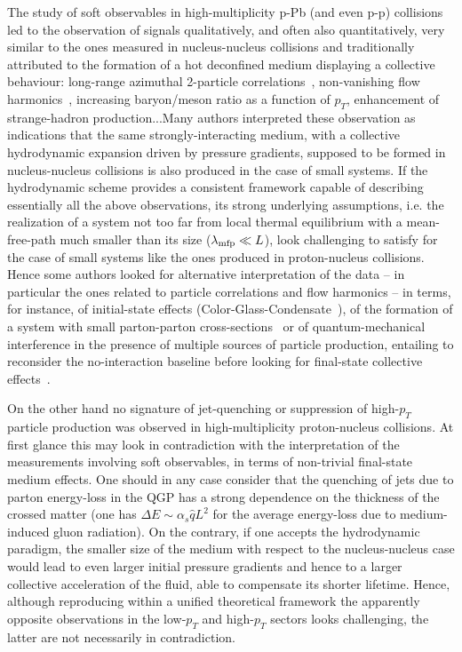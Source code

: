 The study of soft observables in high-multiplicity p-Pb (and even p-p) collisions led to the observation of signals qualitatively, and often also quantitatively, very similar to the ones measured in nucleus-nucleus collisions and traditionally attributed to the formation of a hot deconfined medium displaying a collective behaviour: long-range azimuthal 2-particle correlations~\cite{Khachatryan:2010gv,CMS:2012qk,Abelev:2012ola,Aad:2012gla}, non-vanishing flow harmonics~\cite{ABELEV:2013wsa,Khachatryan:2015waa}, increasing baryon/meson ratio as a function of $p_T$, enhancement of strange-hadron production...Many authors interpreted these observation as indications that the same strongly-interacting medium, with a collective hydrodynamic expansion driven by pressure gradients, supposed to be formed in nucleus-nucleus collisions is also produced in the case of small systems. If the hydrodynamic scheme provides a consistent framework capable of describing essentially all the above observations, its strong underlying assumptions, i.e. the realization of a system not too far from local thermal equilibrium with a mean-free-path much smaller than its size ($\lambda_{\rm mfp}\ll L$), look challenging to satisfy for the case of small systems like the ones produced in proton-nucleus collisions. Hence some authors looked for alternative interpretation of the data -- in particular the ones related to particle correlations and flow harmonics -- in terms, for instance, of initial-state effects (Color-Glass-Condensate~\cite{Dusling:2013qoz}), of the formation of a system with small parton-parton cross-sections~\cite{Bzdak:2014dia} or of quantum-mechanical interference in the presence of multiple sources of particle production, entailing to reconsider the no-interaction baseline before looking for final-state collective effects~\cite{Blok:2017pui}.

On the other hand no signature of jet-quenching or suppression of high-$p_T$ particle production was observed in high-multiplicity proton-nucleus collisions. At first glance this may look in contradiction with the interpretation of the  measurements involving soft observables, in terms of non-trivial final-state medium effects. One should in any case consider that the quenching of jets due to parton energy-loss in the QGP has a strong dependence on the thickness of the crossed matter (one has $\Delta E\sim \alpha_s\hat q L^2$ for the average energy-loss due to medium-induced gluon radiation). On the contrary, if one accepts the hydrodynamic paradigm, the smaller size of the medium with respect to the nucleus-nucleus case would lead to even larger initial pressure gradients and hence to a larger collective acceleration of the fluid, able to compensate its shorter lifetime. Hence, although reproducing within a unified theoretical framework the apparently opposite observations in the low-$p_T$ and high-$p_T$ sectors looks challenging, the latter are not necessarily in contradiction.

